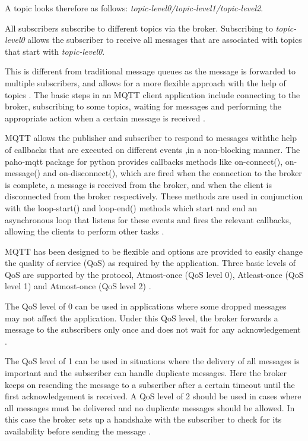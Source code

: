 \documentclass[sigconf]{acmart}
\begin{document}
A topic looks therefore as follows: {\em topic-level0/topic-level1/topic-level2}.

All subscribers subscribe to different topics via the broker.
Subscribing to {\em topic-level0} allows the subscriber to receive all
messages that are associated with topics that start with {\em
topic-level0}.

This is different from traditional message queues as the message is
forwarded to multiple subscribers, and allows for a more flexible
approach with the help of topics \cite{hivemq-details}. The basic
steps in an MQTT client application include connecting to the broker,
subscribing to some topics, waiting for messages and performing the
appropriate action when a certain message is received
\cite{mqtt-wiki}.

MQTT allows the publisher and subscriber to respond to messages withthe help of callbacks that are executed on different events ,in a non-blocking manner. The paho-mqtt package for python provides callbacks methods like on-connect(), on-message() and on-disconnect(), which are fired when
the connection to the broker is complete, a message is received from
the broker, and when the client is disconnected from the broker
respectively. These methods are used in conjunction with the
loop-start() and loop-end() methods which start and end an
asynchronous loop that listens for these events and fires the relevant
callbacks, allowing the clients to perform other tasks
\cite{python-paho-mqtt}.

MQTT has been designed to be flexible and options are provided to
easily change the quality of service (QoS) as required by the
application. Three basic levels of QoS are supported by the protocol,
Atmost-once (QoS level 0), Atleast-once (QoS level 1) and Atmost-once
(QoS level 2) \cite{hivemq-qos}\cite{python-paho-mqtt}.

The QoS level of 0 can be used in applications where some dropped
messages may not affect the application. Under this QoS level, the
broker forwards a message to the subscribers only once and does not
wait for any acknowledgement \cite{hivemq-qos}
\cite{python-paho-mqtt}.

The QoS level of 1 can be used in situations where the delivery of all
messages is important and the subscriber can handle duplicate
messages. Here the broker keeps on resending the message to a
subscriber after a certain timeout until the first acknowledgement is
received. A QoS level of 2 should be used in cases where all messages
must be delivered and no duplicate messages should be allowed. In this
case the broker sets up a handshake with the subscriber to check for
its availability before sending the message \cite{hivemq-qos}
\cite{python-paho-mqtt}.
\end{document}
